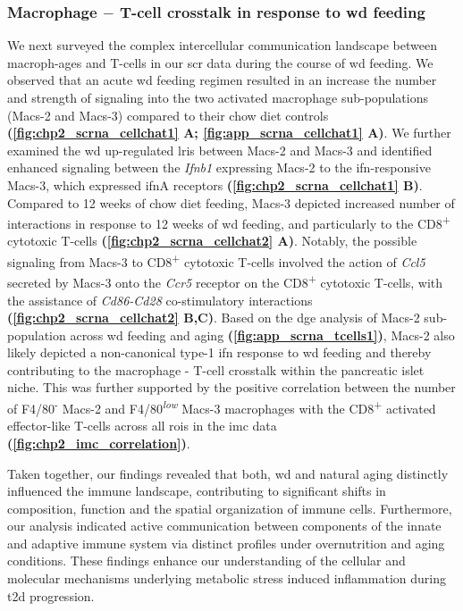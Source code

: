\subsubsection{Macrophage $-$ T-cell crosstalk in response to \gls{wd} feeding}
We next surveyed the complex intercellular communication landscape between macroph-ages and T-cells in our \gls{scr} data during the course of \gls{wd} feeding. We observed that an acute \gls{wd} feeding regimen resulted in an increase the number and strength of signaling into the two activated macrophage sub-populations (Macs-2 and Macs-3) compared to their chow diet controls \textbf{(\autoref{fig:chp2_scrna_cellchat1} A; \autoref{fig:app_scrna_cellchat1} A)}. We further examined the  \gls{wd} up-regulated \glspl{lri} between Macs-2 and Macs-3 and identified enhanced signaling between the \textit{Ifnb1} expressing Macs-2 to the \gls{ifn}-responsive Macs-3, which expressed \gls{ifn}A receptors \textbf{(\autoref{fig:chp2_scrna_cellchat1} B)}. Compared to 12 weeks of chow diet feeding, Macs-3 depicted increased  number of interactions in response to 12 weeks of \gls{wd} feeding, and particularly to the CD8\textsuperscript{+} cytotoxic T-cells \textbf{(\autoref{fig:chp2_scrna_cellchat2} A)}. 
Notably, the possible signaling from Macs-3 to CD8\textsuperscript{+} cytotoxic T-cells involved the action of \textit{Ccl5} secreted by Macs-3 onto the \textit{Ccr5} receptor on the CD8\textsuperscript{+} cytotoxic T-cells, with the assistance of \textit{Cd86-Cd28} co-stimulatory interactions \textbf{(\autoref{fig:chp2_scrna_cellchat2} B,C)}. Based on the \gls{dge} analysis of Macs-2 sub-population across \gls{wd} feeding and aging \textbf{(\autoref{fig:app_scrna_tcells1})}, Macs-2 also likely depicted a non-canonical type-1 \gls{ifn} response to \gls{wd} feeding and thereby contributing to the macrophage - T-cell crosstalk within the pancreatic islet niche. This was further supported by the positive correlation between the number of F4/80\textsuperscript{-} Macs-2 and F4/80\textsuperscript{\textit{low}} Macs-3 macrophages with the CD8\textsuperscript{+} activated effector-like T-cells across all \glspl{roi} in the \gls{imc} data \textbf{(\autoref{fig:chp2_imc_correlation})}.\\
\par Taken together, our findings revealed that both, \gls{wd} and natural aging distinctly influenced the immune landscape, contributing to significant shifts in composition, function and the spatial organization of immune cells. Furthermore, our analysis indicated active communication between components of the innate and adaptive immune system via distinct profiles under overnutrition and aging conditions. These findings enhance our understanding of the cellular and molecular mechanisms underlying metabolic stress induced inflammation during \gls{t2d} progression.

